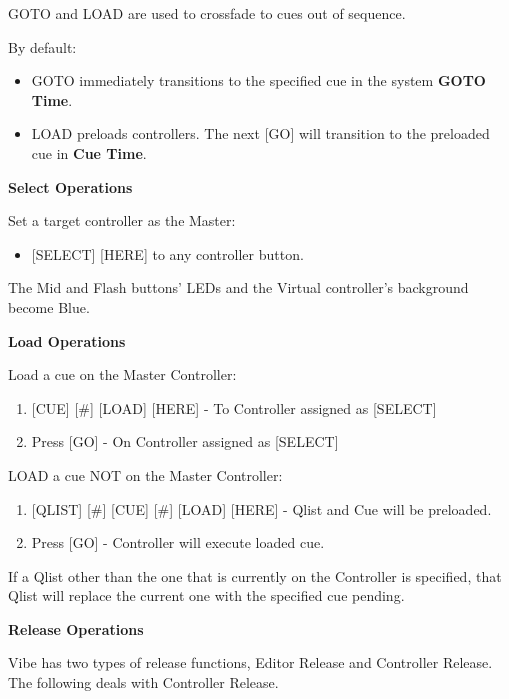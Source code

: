 \documentclass[
]{article}
\providecommand{\tightlist}{%
  \setlength{\itemsep}{0pt}\setlength{\parskip}{0pt}}
\begin{document}
GOTO and LOAD are used to crossfade to cues out of sequence.

By default:

\begin{itemize}
\item
  GOTO immediately transitions to the specified cue in the system \textbf{GOTO Time}.
\item
  LOAD preloads controllers. The next {[}GO{]} will transition to the preloaded cue in \textbf{Cue Time}.
\end{itemize}

\textbf{Select Operations}

Set a target controller as the Master:

\begin{itemize}
\tightlist
\item
  {[}SELECT{]} {[}HERE{]} to any controller button.
\end{itemize}

The Mid and Flash buttons' LEDs and the Virtual controller's background become Blue.

\textbf{Load Operations}

Load a cue on the Master Controller:

\begin{enumerate}
\def\labelenumi{\arabic{enumi}.}
\item
  {[}CUE{]} {[}\#{]} {[}LOAD{]} {[}HERE{]} - To Controller assigned as {[}SELECT{]}
\item
  Press {[}GO{]} - On Controller assigned as {[}SELECT{]}
\end{enumerate}

LOAD a cue NOT on the Master Controller:

\begin{enumerate}
\def\labelenumi{\arabic{enumi}.}
\item
  {[}QLIST{]} {[}\#{]} {[}CUE{]} {[}\#{]} {[}LOAD{]} {[}HERE{]} - Qlist and Cue will be preloaded.
\item
  Press {[}GO{]} - Controller will execute loaded cue.
\end{enumerate}

{If a Qlist other than the one that is currently on the Controller is specified, that Qlist will replace the current one with the specified cue pending.}

\textbf{Release Operations}

Vibe has two types of release functions, Editor Release and Controller Release. The following deals with Controller Release.
\end{document}
